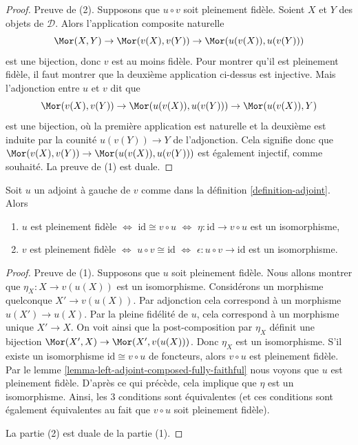 \begin{proof}
Preuve de (2). Supposons que $u \circ v$ soit pleinement fidèle. Soient
$X$ et $Y$ des objets de $\mathcal{D}$. Alors l'application composite
naturelle
$$
\Mor(X,Y) \to \Mor(v(X),v(Y)) \to \Mor(u(v(X)), u(v(Y)))
$$
est une bijection, donc $v$ est au moins fidèle. Pour montrer qu'il est
pleinement fidèle, il faut montrer que la deuxième application ci-dessus est injective.
Mais l'adjonction entre $u$ et $v$ dit que
$$
\Mor(v(X), v(Y)) \to \Mor(u(v(X)), u(v(Y))) \to \Mor(u(v(X)), Y)
$$
est une bijection, où la première application est naturelle et la deuxième
est induite par la counité $u(v(Y)) \to Y$ de l'adjonction. Cela signifie
donc que $\Mor(v(X), v(Y)) \to \Mor(u(v(X)), u(v(Y)))$ est également injectif,
comme souhaité. La preuve de (1) est duale.
\end{proof}

\begin{lemma}
\label{lemma-adjoint-fully-faithful}
Soit $u$ un adjoint à gauche de $v$ comme dans la définition
\ref{definition-adjoint}. Alors
\begin{enumerate}
\item $u$ est pleinement fidèle $\Leftrightarrow$ $\text{id} \cong v \circ u$
$\Leftrightarrow$ $\eta : \text{id} \to v \circ u$ est un isomorphisme,
\item $v$ est pleinement fidèle $\Leftrightarrow$ $u \circ v \cong \text{id}$
$\Leftrightarrow$ $\epsilon : u \circ v \to \text{id}$ est un isomorphisme.
\end{enumerate}
\end{lemma}

\begin{proof}
Preuve de (1). Supposons que $u$ soit pleinement fidèle. Nous allons montrer
que $\eta_X : X \to v(u(X))$ est un isomorphisme. Considérons un morphisme
quelconque $X' \to v(u(X))$. Par adjonction cela correspond à un morphisme $u(X') \to u(X)$. Par la pleine fidélité de $u$, cela correspond à un morphisme unique $X' \to X$. On voit ainsi que la post-composition par $\eta_X$ définit une
bijection $\Mor(X', X) \to \Mor(X', v(u(X)))$. Donc $\eta_X$ est un
isomorphisme. S'il existe un isomorphisme $\text{id} \cong v \circ u$ de
foncteurs, alors $v \circ u$ est pleinement fidèle. Par le lemme
\ref{lemma-left-adjoint-composed-fully-faithful} nous voyons que $u$ est
pleinement fidèle. D'après ce qui précède, cela implique que $\eta$ est un
isomorphisme. Ainsi, les $3$ conditions sont équivalentes (et ces
conditions sont également équivalentes au fait que $v \circ u$ soit
pleinement fidèle).

\medskip\noindent
La partie (2) est duale de la partie (1).
\end{proof}

